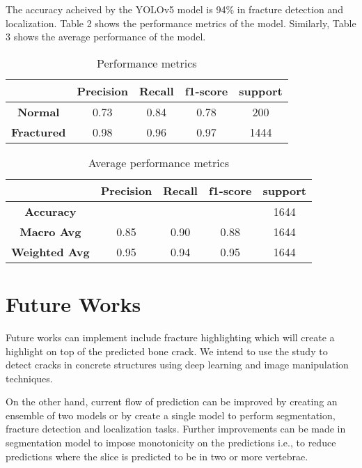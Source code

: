 \documentclass[pdflatex,sn-mathphys]{sn-jnl}%
\theoremstyle{thmstyleone}%
\theoremstyle{thmstyletwo}%
\theoremstyle{thmstylethree}%
\begin{document}
The accuracy acheived by the YOLOv5 model is 94\% in fracture detection and localization. Table 2 shows the performance metrics of the model. Similarly, Table 3 shows the average performance of the model.

\begin{table}[!h]
\centering
\begin{tabular}{|ccccc|}\hline
 & \textbf{Precision} & \textbf{Recall} & \textbf{f1-score} & \textbf{support} \\\hline
\textbf{Normal} & 0.73 & 0.84 & 0.78 & 200 \\ \hline
\textbf{Fractured} & 0.98 & 0.96 & 0.97 & 1444\\\hline
\end{tabular}
\caption{\centering\footnotesize{ Performance metrics }}
\end{table}

\begin{table}[!h]
\centering
\begin{tabular}{|ccccc|}\hline
 & \textbf{Precision} & \textbf{Recall} & \textbf{f1-score} & \textbf{support} \\\hline
\textbf{Accuracy} &  &  &  & 1644 \\\hline
\textbf{Macro Avg} & 0.85 & 0.90 & 0.88 & 1644 \\\hline
\textbf{Weighted Avg} & 0.95 & 0.94 & 0.95 & 1644\\\hline
\end{tabular}
\caption{\centering\footnotesize{ Average performance metrics }}
\end{table}




\section{Future Works}\label{sec12}

Future works can implement include fracture highlighting which will create a highlight on top of the predicted bone crack. We intend to use the study to detect cracks in concrete structures using deep learning and image manipulation techniques\cite{su14138117}. 

On the other hand, current flow of prediction can be improved by creating an ensemble of two models or by create a single model to perform segmentation, fracture detection and localization tasks. Further improvements can be made in segmentation model to impose monotonicity on the predictions i.e., to reduce predictions where the slice is predicted to be in two or more vertebrae.
\end{document}
